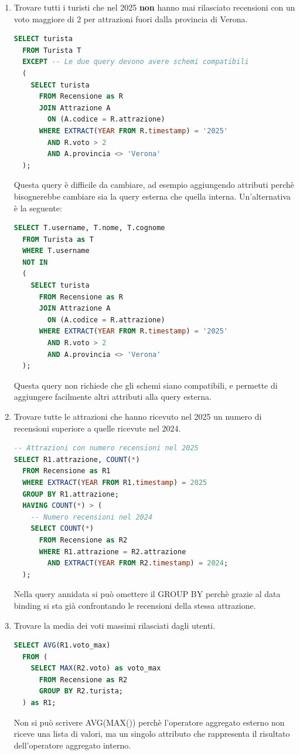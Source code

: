 \documentclass[a4paper,twoside]{article}
\begin{document}
\begin{exercise}
\begin{enumerate}
    \item Trovare tutti i turisti che nel 2025 \textbf{non} hanno mai rilasciato
      recensioni con un voto maggiore di 2 per attrazioni fuori dalla provincia
      di Verona.
\begin{lstlisting}[language=SQL]
SELECT turista
  FROM Turista T
  EXCEPT -- Le due query devono avere schemi compatibili
  (
    SELECT turista
      FROM Recensione as R
      JOIN Attrazione A
        ON (A.codice = R.attrazione)
      WHERE EXTRACT(YEAR FROM R.timestamp) = '2025'
        AND R.voto > 2 
        AND A.provincia <> 'Verona'
  );
\end{lstlisting}
      Questa query è difficile da cambiare, ad esempio aggiungendo attributi perchè
      bisognerebbe cambiare sia la query esterna che quella interna.
      Un'alternativa è la seguente:
\begin{lstlisting}[language=SQL]
SELECT T.username, T.nome, T.cognome
  FROM Turista as T
  WHERE T.username
  NOT IN
  (
    SELECT turista
      FROM Recensione as R
      JOIN Attrazione A
        ON (A.codice = R.attrazione)
      WHERE EXTRACT(YEAR FROM R.timestamp) = '2025'
        AND R.voto > 2 
        AND A.provincia <> 'Verona'
  );
\end{lstlisting}
      Questa query non richiede che gli schemi siano compatibili, e permette di
      aggiungere facilmente altri attributi alla query esterna.

    \item Trovare tutte le attrazioni che hanno ricevuto nel 2025 un numero di
      recensioni superiore a quelle ricevute nel 2024.
\begin{lstlisting}[language=SQL]
-- Attrazioni con numero recensioni nel 2025
SELECT R1.attrazione, COUNT(*)
  FROM Recensione as R1
  WHERE EXTRACT(YEAR FROM R1.timestamp) = 2025
  GROUP BY R1.attrazione;
  HAVING COUNT(*) > (
    -- Numero recensioni nel 2024
    SELECT COUNT(*)
      FROM Recensione as R2
      WHERE R1.attrazione = R2.attrazione
        AND EXTRACT(YEAR FROM R2.timestamp) = 2024;
  );
\end{lstlisting}
      Nella query annidata si può omettere il GROUP BY perchè grazie al data binding
      si sta già confrontando le recensioni della stessa attrazione.

    \item Trovare la media dei voti massimi rilasciati dagli utenti.
\begin{lstlisting}[language=SQL]
SELECT AVG(R1.voto_max)
  FROM (
    SELECT MAX(R2.voto) as voto_max
      FROM Recensione as R2
      GROUP BY R2.turista;
  ) as R1;
\end{lstlisting}
      Non si può scrivere AVG(MAX()) perchè l'operatore aggregato esterno non riceve
      una lista di valori, ma un singolo attributo che rappresenta il risultato
      dell'operatore aggregato interno.

  \end{enumerate}
\end{exercise}
\end{document}
